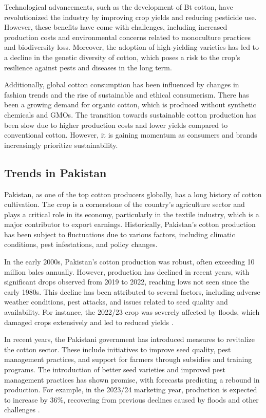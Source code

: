 \documentclass[12pt]{article}
\begin{document}
Technological advancements, such as the development of Bt cotton, have revolutionized the industry by improving crop yields and reducing pesticide use. However, these benefits have come with challenges, including increased production costs and environmental concerns related to monoculture practices and biodiversity loss. Moreover, the adoption of high-yielding varieties has led to a decline in the genetic diversity of cotton, which poses a risk to the crop’s resilience against pests and diseases in the long term.

Additionally, global cotton consumption has been influenced by changes in fashion trends and the rise of sustainable and ethical consumerism. There has been a growing demand for organic cotton, which is produced without synthetic chemicals and GMOs. The transition towards sustainable cotton production has been slow due to higher production costs and lower yields compared to conventional cotton. However, it is gaining momentum as consumers and brands increasingly prioritize sustainability.

\subsection{Trends in Pakistan}

Pakistan, as one of the top cotton producers globally, has a long history of cotton cultivation. The crop is a cornerstone of the country's agriculture sector and plays a critical role in its economy, particularly in the textile industry, which is a major contributor to export earnings. Historically, Pakistan's cotton production has been subject to fluctuations due to various factors, including climatic conditions, pest infestations, and policy changes.

In the early 2000s, Pakistan's cotton production was robust, often exceeding 10 million bales annually. However, production has declined in recent years, with significant drops observed from 2019 to 2022, reaching lows not seen since the early 1980s. This decline has been attributed to several factors, including adverse weather conditions, pest attacks, and issues related to seed quality and availability. For instance, the 2022/23 crop was severely affected by floods, which damaged crops extensively and led to reduced yields \cite{usda2023, usda2022, usda2021}.

In recent years, the Pakistani government has introduced measures to revitalize the cotton sector. These include initiatives to improve seed quality, pest management practices, and support for farmers through subsidies and training programs. The introduction of better seed varieties and improved pest management practices has shown promise, with forecasts predicting a rebound in production. For example, in the 2023/24 marketing year, production is expected to increase by 36\%, recovering from previous declines caused by floods and other challenges \cite{usda2023, usda2021}.
\end{document}
